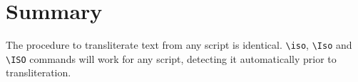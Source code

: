 \section{Summary}

The procedure to transliterate text from any script is identical.
\texttt{\textbackslash iso}, \texttt{\textbackslash Iso} and
\texttt{\textbackslash ISO} commands will work for any script, detecting it
automatically prior to transliteration.

